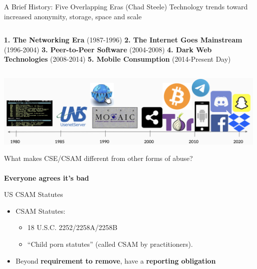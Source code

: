 \documentclass[nobackground,dvipsnames,table,aspectratio=169]{beamer}
\begin{document}
\begin{frame}{A Brief History: Five Overlapping Eras (Chad Steele)}
    Technology trends toward increased anonymity, storage, space and scale
    \begin{columns}[T]
            \textbf{1. The Networking Era} (1987-1996)
            \textbf{2. The Internet Goes Mainstream} (1996-2004)
             \textbf{3. Peer-to-Peer Software} (2004-2008)
             \textbf{4. Dark Web Technologies} (2008-2014)
             \textbf{5. Mobile Consumption} (2014-Present Day)
    \end{columns}
    \includegraphics[width=\textwidth]{timeline}
\end{frame}

\begin{frame}{}
    \centering
    \Large{What makes CSE/CSAM different from other forms of abuse?}\\~\\
    \LARGE{\textbf{Everyone agrees it’s bad}}
\end{frame}

\begin{frame}{US CSAM Statutes}
    \begin{itemize}
        \item CSAM Statutes: 
        \begin{itemize}
            \item 18 U.S.C. 2252/2258A/2258B
            \item “Child porn statutes” (called CSAM by practitioners). 
        \end{itemize}
        \item Beyond \textbf{requirement to remove}, have a \textbf{reporting obligation}
    \end{itemize}
\end{frame}
\end{document}
